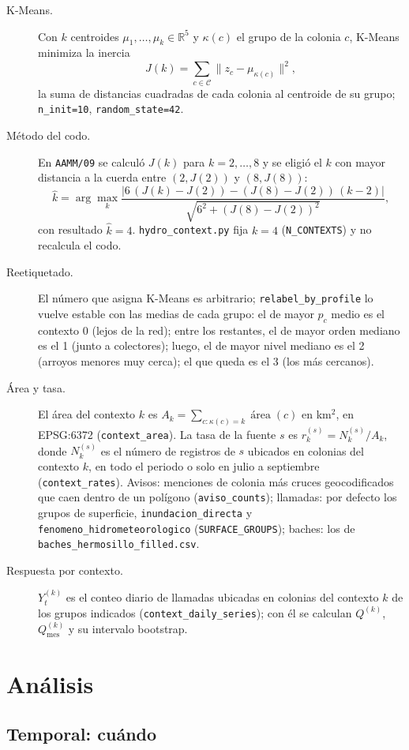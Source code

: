 \documentclass[11pt]{article}
\newcommand{\cod}[1]{\nolinkurl{#1}}
\begin{document}
\begin{description}
  \item[K-Means.] Con $k$ centroides $\mu_1,\dots,\mu_k\in\mathbb{R}^5$ y $\kappa(c)$ el grupo de la colonia $c$, K-Means minimiza la inercia
  \[ J(k)=\sum_{c\in\mathcal{C}}\bigl\lVert z_c-\mu_{\kappa(c)}\bigr\rVert^2 , \]
  la suma de distancias cuadradas de cada colonia al centroide de su grupo; \cod{n_init=10}, \cod{random_state=42}.
  \item[Método del codo.] En \cod{AAMM/09} se calculó $J(k)$ para $k=2,\dots,8$ y se eligió el $k$ con mayor distancia a la cuerda entre $(2,J(2))$ y $(8,J(8))$:
  \[ \hat{k}=\arg\max_k \frac{\bigl|6\,(J(k)-J(2))-(J(8)-J(2))\,(k-2)\bigr|}{\sqrt{6^2+(J(8)-J(2))^2}} , \]
  con resultado $\hat{k}=4$. \cod{hydro_context.py} fija $k=4$ (\cod{N_CONTEXTS}) y no recalcula el codo.
  \item[Reetiquetado.] El número que asigna K-Means es arbitrario; \cod{relabel_by_profile} lo vuelve estable con las medias de cada grupo: el de mayor $p_c$ medio es el contexto 0 (lejos de la red); entre los restantes, el de mayor orden mediano es el 1 (junto a colectores); luego, el de mayor nivel mediano es el 2 (arroyos menores muy cerca); el que queda es el 3 (los más cercanos).
  \item[Área y tasa.] El área del contexto $k$ es $A_k=\sum_{c:\kappa(c)=k}\operatorname{área}(c)$ en km$^2$, en EPSG:6372 (\cod{context_area}). La tasa de la fuente $s$ es $r^{(s)}_k=N^{(s)}_k/A_k$, donde $N^{(s)}_k$ es el número de registros de $s$ ubicados en colonias del contexto $k$, en todo el periodo o solo en julio a septiembre (\cod{context_rates}). Avisos: menciones de colonia más cruces geocodificados que caen dentro de un polígono (\cod{aviso_counts}); llamadas: por defecto los grupos de superficie, \cod{inundacion_directa} y \cod{fenomeno_hidrometeorologico} (\cod{SURFACE_GROUPS}); baches: los de \cod{baches_hermosillo_filled.csv}.
  \item[Respuesta por contexto.] $Y^{(k)}_t$ es el conteo diario de llamadas ubicadas en colonias del contexto $k$ de los grupos indicados (\cod{context_daily_series}); con él se calculan $Q^{(k)}$, $Q^{(k)}_{\text{mes}}$ y su intervalo bootstrap.
\end{description}

\section{Análisis}
\label{sec:analisis}

\subsection{Temporal: cuándo}
\label{sec:temporal}
\end{document}
